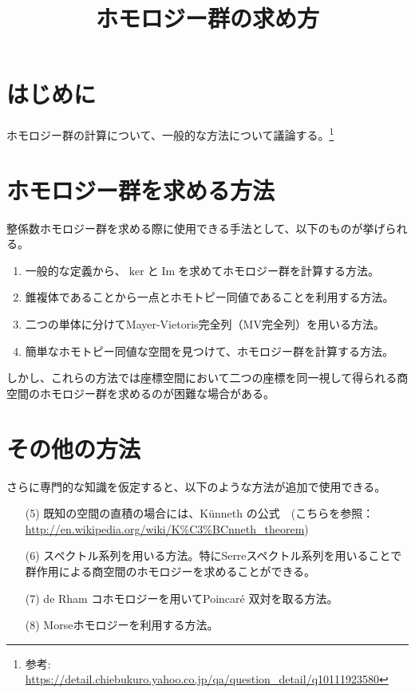\documentclass{article}
\begin{document}
\title{ホモロジー群の求め方}
\author{}
\date{}
\maketitle

\section{はじめに}
ホモロジー群の計算について、一般的な方法について議論する。\footnote{参考: \url{https://detail.chiebukuro.yahoo.co.jp/qa/question_detail/q10111923580}}

\section{ホモロジー群を求める方法}
整係数ホモロジー群を求める際に使用できる手法として、以下のものが挙げられる。

\begin{enumerate}
    \item 一般的な定義から、$\ker$と$\operatorname{Im}$を求めてホモロジー群を計算する方法。
    \item 錐複体であることから一点とホモトピー同値であることを利用する方法。
    \item 二つの単体に分けてMayer-Vietoris完全列（MV完全列）を用いる方法。
    \item 簡単なホモトピー同値な空間を見つけて、ホモロジー群を計算する方法。
\end{enumerate}

しかし、これらの方法では座標空間において二つの座標を同一視して得られる商空間のホモロジー群を求めるのが困難な場合がある。

\section{その他の方法}
さらに専門的な知識を仮定すると、以下のような方法が追加で使用できる。

\begin{enumerate}
    \item[(5)] 既知の空間の直積の場合には、K\"unneth の公式　(こちらを参照：\url{http://en.wikipedia.org/wiki/K%C3%BCnneth_theorem})
    \item[(6)] スペクトル系列を用いる方法。特にSerreスペクトル系列を用いることで群作用による商空間のホモロジーを求めることができる。
    \item[(7)] de Rham コホモロジーを用いてPoincar\'e 双対を取る方法。
    \item[(8)] Morseホモロジーを利用する方法。
\end{enumerate}
\end{document}
